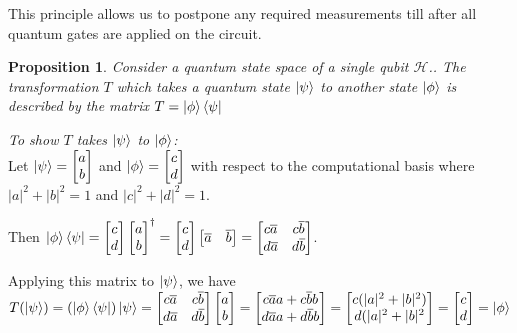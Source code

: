 \documentclass[12pt,twoside,fleqn]{report}
\makeatletter
\theoremstyle{thmstyle}
\renewenvironment{proof}[1][\proofname]{\par
\pushQED{\qed}%
\normalfont \topsep6\p@\@plus6\p@\relax
\trivlist
\item[\hskip\labelsep\itshape#1\@addpunct{.}]\mbox{}\par\nobreak\ignorespaces
}{%
    \popQED\endtrivlist\@endpefalse
    }
\newtheorem{prop}{Proposition}[chapter]
\makeatother
\begin{document}
This principle allows us to postpone any required measurements till after all quantum gates are applied on the circuit.

\begin{prop}
    Consider a quantum state space of a single qubit $\mathcal{H}$..
    The transformation $T$ which takes a quantum state $\ket\psi$ to another state $\ket\phi$ is described by the matrix $T = \ket{\phi}\bra{\psi}$
\end{prop}
\begin{proof}
    \emph{To show $T$ takes $\ket{\psi}$ to $\ket{\phi}$: }\\
    Let $\ket\psi = \begin{bmatrix} a \\ b \end{bmatrix}$ and $\ket\phi = \begin{bmatrix} c \\ d \end{bmatrix}$ with respect to the computational basis where $|a|^2 + |b|^2 = 1$ and $|c|^2 + |d|^2 = 1$.

        Then $\ket\phi \bra\psi = \begin{bmatrix} c \\ d \end{bmatrix}\begin{bmatrix} a \\ b \end{bmatrix}^\dagger = \begin{bmatrix} c \\ d \end{bmatrix} \begin{bmatrix} \overline{a} & \overline{b} \end{bmatrix} = \begin{bmatrix} c \overline{a} & c \overline{b} \\ d \overline{a} & d \overline{b} \end{bmatrix}$.

            Applying this matrix to $\ket\psi$, we have $T (\ket\psi) = (\ket\phi \bra\psi) \ket\psi =   \begin{bmatrix} c \overline{a} & c \overline{b} \\ d \overline{a} & d \overline{b} \end{bmatrix} \begin{bmatrix} a \\ b \end{bmatrix} = \begin{bmatrix} c \overline{a} a + c \overline{b} b \\ d \overline{a} a + d \overline{b} b\end{bmatrix} = \begin{bmatrix} c (|a|^2 + |b|^2) \\ d (|a|^2 + |b|^2 \end{bmatrix} = \begin{bmatrix} c \\ d \end{bmatrix} = \ket{\phi}$

\end{proof}
\end{document}
